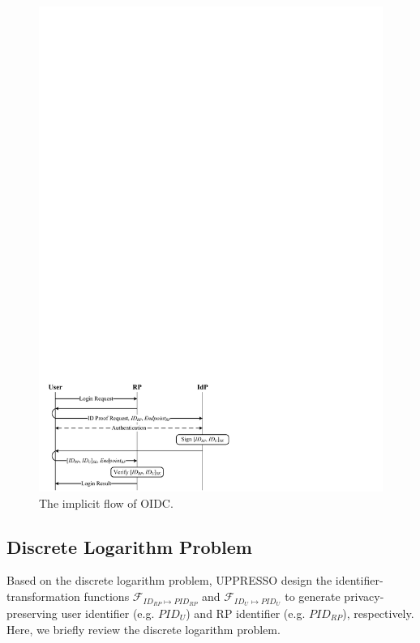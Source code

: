 \begin{figure}[t]
  \centering
  \includegraphics[width=\linewidth]{fig/OIDC1.pdf}
  \caption{The implicit flow of OIDC.}
  \label{fig:OpenID}
\end{figure}

\subsection{Discrete Logarithm Problem}
\label{sec:dlp}

Based on the discrete logarithm problem, UPPRESSO design the identifier-transformation functions $\mathcal{F}_{ID_{RP} \mapsto PID_{RP}}$ and $\mathcal{F}_{ID_{U} \mapsto PID_{U}}$ to generate privacy-preserving user identifier (e.g. $PID_U$) and RP identifier (e.g. $PID_{RP}$), respectively. Here, we briefly review the discrete logarithm problem.

